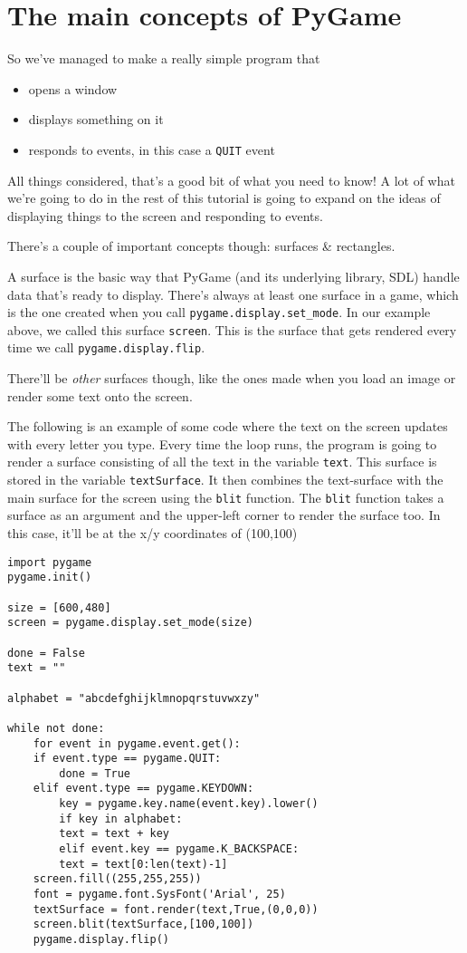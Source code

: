 \documentclass[11pt]{article}
\begin{document}
\section{The main concepts of PyGame}
\label{sec:org3fec032}
So we've managed to make a really simple program that
\begin{itemize}
\item opens a window
\item displays something on it
\item responds to events, in this case a \texttt{QUIT} event
\end{itemize}

All things considered, that's a good bit of what you need to know! A lot of what we're going to do in the rest of this tutorial is going to expand on the ideas of displaying things to the screen and responding to events.

There's a couple of important concepts though: surfaces \& rectangles. 

A surface is the basic way that PyGame (and its underlying library, SDL) handle data that's ready to display. There's always at least one surface in a game, which is the one created when you call \texttt{pygame.display.set\_mode}. In our example above, we called this surface \texttt{screen}. This is the surface that gets rendered every time we call \texttt{pygame.display.flip}. 

There'll be \emph{other} surfaces though, like the ones made when you load an image or render some text onto the screen. 

The following is an example of some code where the text on the screen updates with every letter you type. Every time the loop runs, the program is going to render a surface consisting of all the text in the variable \texttt{text}. This surface is stored in the variable \texttt{textSurface}. It then combines the text-surface with the main surface for the screen using the \texttt{blit} function. The \texttt{blit} function takes a surface as an argument and the upper-left corner to render the surface too. In this case, it'll be at the x/y coordinates of (100,100)

\begin{verbatim}
import pygame
pygame.init()

size = [600,480]
screen = pygame.display.set_mode(size)

done = False
text = ""

alphabet = "abcdefghijklmnopqrstuvwxzy"

while not done:
    for event in pygame.event.get():
	if event.type == pygame.QUIT:
	    done = True
	elif event.type == pygame.KEYDOWN:
	    key = pygame.key.name(event.key).lower()
	    if key in alphabet:
		text = text + key
	    elif event.key == pygame.K_BACKSPACE:
		text = text[0:len(text)-1]
    screen.fill((255,255,255))
    font = pygame.font.SysFont('Arial', 25)
    textSurface = font.render(text,True,(0,0,0))
    screen.blit(textSurface,[100,100])
    pygame.display.flip()
\end{verbatim}
\end{document}
